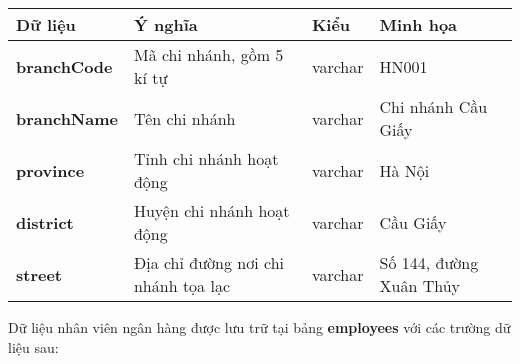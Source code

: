 \begin{center}
    \begin{tabular}{ | m{9em} | m{15em}| m{5em} | m{5em} | } 
    \hline
    \rowcolor{gray!30}
    Dữ liệu & Ý nghĩa & Kiểu & Minh họa \\ 

    \hline
    \textbf{branchCode} &
    Mã chi nhánh, gồm 5 kí tự &
    varchar &
    HN001 \\

    \hline
    \textbf{branchName} &
    Tên chi nhánh &
    varchar &
    Chi nhánh Cầu Giấy \\

    \hline
    \textbf{province} &
    Tỉnh chi nhánh hoạt động &
    varchar &
    Hà Nội \\

    \hline
    \textbf{district} &
    Huyện chi nhánh hoạt động &
    varchar &
    Cầu Giấy \\

    \hline
    \textbf{street} &
    Địa chỉ đường nơi chi nhánh tọa lạc &
    varchar &
    Số 144, đường Xuân Thủy \\

    \hline
    \end{tabular}
\end{center}




\newpage
\noindent
Dữ liệu nhân viên ngân hàng được lưu trữ tại bảng \textbf{employees} với các trường dữ liệu sau:

\renewcommand{\arraystretch}{2} %
\setlength{\tabcolsep}{10pt}

